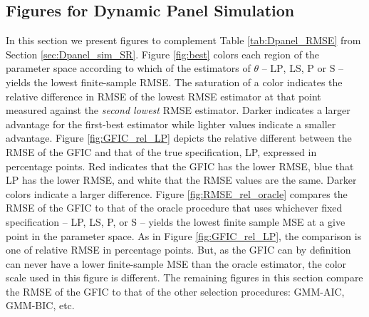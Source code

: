 \subsection{Figures for Dynamic Panel Simulation}
In this section we present figures to complement Table \ref{tab:Dpanel_RMSE} from Section \ref{sec:Dpanel_sim_SR}.
Figure \ref{fig:best} colors each region of the parameter space according to which of the estimators of $\theta$ -- $\text{LP}$, $\text{LS}$, $\text{P}$ or $\text{S}$ -- yields the lowest finite-sample RMSE.
The saturation of a color indicates the relative difference in RMSE of the lowest RMSE estimator at that point measured against the \emph{second lowest} RMSE estimator.
Darker indicates a larger advantage for the first-best estimator while lighter values indicate a smaller advantage. 
Figure \ref{fig:GFIC_rel_LP} depicts the relative different between the RMSE of the GFIC and that of the true specification, LP, expressed in percentage points.
Red indicates that the GFIC has the lower RMSE, blue that LP has the lower RMSE, and white that the RMSE values are the same. 
Darker colors indicate a larger difference.
Figure \ref{fig:RMSE_rel_oracle} compares the RMSE of the GFIC to that of the oracle procedure that uses whichever fixed specification -- LP, LS, P, or S -- yields the lowest finite sample MSE at a give point in the parameter space.
As in Figure \ref{fig:GFIC_rel_LP}, the comparison is one of relative RMSE in percentage points.
But, as the GFIC can by definition can never have a lower finite-sample MSE than the oracle estimator, the color scale used in this figure is different.
The remaining figures in this section compare the RMSE of the GFIC to that of the other selection procedures: GMM-AIC, GMM-BIC, etc.


